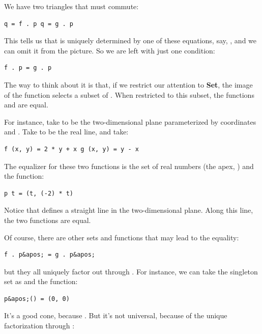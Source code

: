 We have two triangles that must commute:

\begin{verbatim}
q = f . p q = g . p
\end{verbatim}

This tells us that  is uniquely determined by one of these
equations, say, , and we can omit it from the
picture. So we are left with just one condition:

\begin{verbatim}
f . p = g . p
\end{verbatim}

The way to think about it is that, if we restrict our attention to
\textbf{Set}, the image of the function  selects a subset of
. When restricted to this subset, the functions  and
 are equal.

For instance, take  to be the two-dimensional plane
parameterized by coordinates  and . Take 
to be the real line, and take:

\begin{verbatim}
f (x, y) = 2 * y + x g (x, y) = y - x
\end{verbatim}

The equalizer for these two functions is the set of real numbers (the
apex, ) and the function:

\begin{verbatim}
p t = (t, (-2) * t)
\end{verbatim}

Notice that  defines a straight line in the
two-dimensional plane. Along this line, the two functions are equal.

Of course, there are other sets  and functions
 that may lead to the equality:

\begin{verbatim}
f . p&apos; = g . p&apos;
\end{verbatim}

but they all uniquely factor out through . For instance, we
can take the singleton set \code{()} as  and the
function:

\begin{verbatim}
p&apos;() = (0, 0)
\end{verbatim}

It's a good cone, because . But it's
not universal, because of the unique factorization through :


